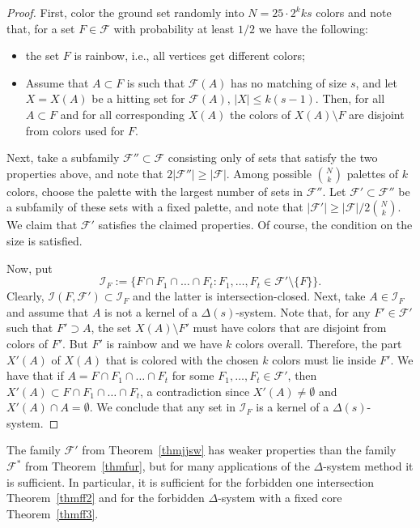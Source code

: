 \documentclass[graybox]{svmult}
\renewcommand{\le}{\leqslant}
\renewcommand{\ge}{\geqslant}
\newcommand{\ff}{\mathcal{F}}
\newcommand{\m}{\mathcal}
\begin{document}
\begin{proof}
  First, color the ground set randomly into $N = 25\cdot 2^{k} ks$ colors and note that, for a set $F\in \ff$ with probability at least $1/2$ we have the following:
  \begin{itemize}
    \item the set $F$ is rainbow, i.e., all vertices get different colors;
    \item Assume that $A\subset F$ is such that $\ff(A)$ has no matching of size $s$, and let $X = X(A)$ be a hitting set for $\ff(A)$, $|X|\le k(s-1)$. Then, for all $A\subset F$ and for all corresponding $X(A)$ the colors of $X(A)\setminus F$ are disjoint from colors used for $F$.
  \end{itemize}
 Next, take a subfamily $\ff''\subset \ff$ consisting only of sets that satisfy the two properties above, and note that $2|\ff''|\ge |\ff|$. Among possible ${N\choose k}$ palettes of $k$ colors, choose the palette with the largest number of sets in $\ff''$. Let $\ff'\subset \ff''$ be a subfamily of these sets with a fixed palette, and note that $|\ff'|\ge |\ff|/2{N\choose k}$. We claim that $\ff'$ satisfies the claimed properties. Of course, the condition on the size is satisfied.

 Now, put $$\m I_F:= \big\{F\cap F_1\cap \ldots\cap F_t: F_1,\ldots, F_t \in \ff'\setminus \{F\}\big\}.$$
 Clearly, $\m I(F,\m F')\subset \m I_F$ and the latter is intersection-closed. Next, take $A\in \m I_F$ and assume that $A$ is not a kernel of a $\Delta(s)$-system. Note that, for any $F'\in \ff'$ such that $F'\supset A$, the set $X(A)\setminus F'$ must have colors that are disjoint from colors of $F'$. But $F'$ is rainbow and we have $k$ colors overall. Therefore, the part $X'(A)$ of $X(A)$ that is colored with the chosen $k$ colors must lie inside $F'$. We have that if $A = F\cap F_1\cap\ldots \cap F_t$ for some $F_1,\ldots , F_t\in \ff'$, then $X'(A) \subset F\cap F_1\cap\ldots \cap F_t$, a contradiction since $X'(A)\ne \emptyset $ and $X'(A)\cap A = \emptyset$. We conclude that any set in $\m I_F$ is a kernel of a $\Delta(s)$-system.
 \end{proof}

The family $\ff'$ from Theorem~\ref{thmjjsw} has weaker properties than the family $\ff^*$ from Theorem~\ref{thmfur}, but for many applications of the $\Delta$-system method it is sufficient. In particular, it is sufficient for the forbidden one intersection Theorem~\ref{thmff2} and for the forbidden $\Delta$-system with a fixed core Theorem~\ref{thmff3}.
\end{document}
